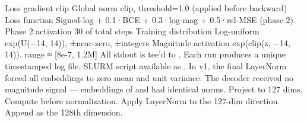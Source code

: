 {}\markdownRendererPipe{} Loss gradient clip \markdownRendererPipe{} Global norm clip, threshold=1.0 (applied before backward) \markdownRendererPipe{}\markdownRendererSoftLineBreak
{}\markdownRendererPipe{} Loss function \markdownRendererPipe{} Signed-log + 0.1·BCE + 0.3·log-mag + 0.5·rel-MSE (phase 2) \markdownRendererPipe{}\markdownRendererSoftLineBreak
{}\markdownRendererPipe{} Phase 2 activation \markdownRendererPipe{} 30\markdownRendererPercentSign{} of total steps \markdownRendererPipe{}\markdownRendererSoftLineBreak
{}\markdownRendererPipe{} Training distribution \markdownRendererPipe{} Log-uniform exp(U(−14, 14)), ±near-zero, ±integers \markdownRendererPipe{}\markdownRendererSoftLineBreak
{}\markdownRendererPipe{} Magnitude activation \markdownRendererPipe{} exp(clip(z, −14, 14)), range ≈ [8e-7, 1.2M] \markdownRendererPipe{}\markdownRendererInterblockSeparator
{}
\markdownRendererSectionEnd \markdownRendererSectionBegin
{}\markdownRendererInterblockSeparator
{}\markdownRendererInterblockSeparator
{}All stdout is tee'd to . Each run produces a unique timestamped log file. SLURM script available as .\markdownRendererInterblockSeparator
{}\markdownRendererThematicBreak{}\markdownRendererInterblockSeparator
{}
\markdownRendererSectionEnd 
\markdownRendererSectionEnd \markdownRendererSectionBegin
{}\markdownRendererInterblockSeparator
{}\markdownRendererSectionBegin
{}\markdownRendererInterblockSeparator
{} In v1, the final LayerNorm forced all embeddings to zero mean and unit variance. The decoder received no magnitude signal — embeddings of  and  had identical norms.\markdownRendererParagraphSeparator
{} Project to 127 dims. Compute  before normalization. Apply LayerNorm to the 127-dim direction. Append  as the 128th dimension.\markdownRendererInterblockSeparator
